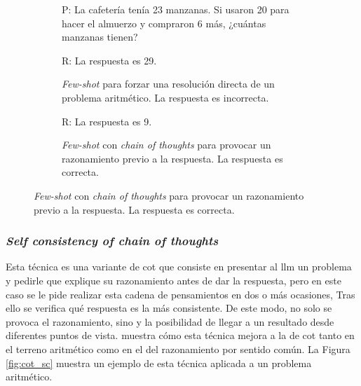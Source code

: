 \begin{figure}[H]
\begin{subfigure}{.48\textwidth}
\begin{mdframed}
        P: La cafetería tenía 23 manzanas. Si usaron 20 para hacer el almuerzo y compraron 6 más, ¿cuántas manzanas tienen?
        \vspace{0.2cm}
      \end{mdframed}
    \end{subfigure}

    \vspace{0.2cm}

    \begin{subfigure}{.48\textwidth}
        \centering
        \begin{mdframed}
          \fontsize{9.5pt}{11pt}\selectfont
        R: La respuesta es 29.
        \end{mdframed}
        \caption{\emph{Few-shot} para forzar una resolución directa de un problema aritmético. La respuesta es incorrecta.}
      \end{subfigure}\hfill
    \begin{subfigure}{.48\textwidth}
      \centering
      \begin{mdframed}
        \fontsize{9.5pt}{11pt}\selectfont
        R:  La respuesta es 9.
      \end{mdframed}
      \caption{\emph{Few-shot} con \emph{chain of thoughts} para provocar un razonamiento previo a la respuesta. La respuesta es correcta.}
    \end{subfigure}

    \label{fig:chain_of_thoughts}
\end{figure}

\subsubsection{\emph{Self consistency of chain of thoughts}}

Esta técnica es una variante de \gls{cot} que consiste en presentar al \gls{llm} un problema y pedirle que explique su razonamiento antes de dar la respuesta, pero en este caso se le pide realizar esta cadena de pensamientos en dos o más ocasiones, Tras ello se verifica qué respuesta es la más consistente. De este modo, no solo se provoca el razonamiento, sino y la posibilidad de llegar a un resultado desde diferentes puntos de vista. \citep{wangSelfConsistencyImprovesChain2023} muestra cómo esta técnica mejora a la de \gls{cot} tanto en el terreno aritmético como en el del razonamiento por sentido común. La Figura \ref{fig:cot_sc} muestra un ejemplo de esta técnica aplicada a un problema aritmético.

